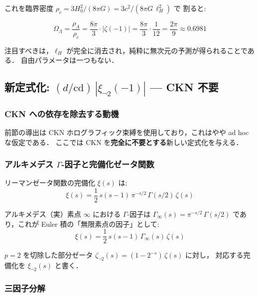 \documentclass[11pt,a4paper]{article}
\begin{document}
これを臨界密度 $\rho_c = 3H_0^2/(8\pi G) = 3c^2/(8\pi G\,\ell_H^2)$ で
割ると:

\begin{keyresult}
\begin{equation}
\Omega_\Lambda = \frac{\rho_\Lambda}{\rho_c}
= \frac{8\pi}{3}\cdot|\zeta(-1)|
= \frac{8\pi}{3}\cdot\frac{1}{12}
= \frac{2\pi}{9}
\approx 0.6981
\end{equation}
\end{keyresult}

注目すべきは，$\ell_H$ が完全に消去され，純粋に無次元の予測が得られることである．
自由パラメータは一つもない．

\subsection{新定式化: $(d/\mathrm{cd})\,|\xi_{\neg 2}(-1)|$ — CKN 不要}

\subsubsection{CKN への依存を除去する動機}

前節の導出は CKN ホログラフィック束縛を使用しており，これはやや ad hoc な仮定である．
ここでは CKN を\textbf{完全に不要とする}新しい定式化を与える．

\subsubsection{アルキメデス $\Gamma$-因子と完備化ゼータ関数}

リーマンゼータ関数の完備化 $\xi(s)$ は:
\begin{equation}
\xi(s) = \frac{1}{2}\,s(s-1)\,\pi^{-s/2}\,\Gamma(s/2)\,\zeta(s)
\end{equation}

アルキメデス（実）素点 $\infty$ における $\Gamma$-因子は
$\Gamma_\infty(s) = \pi^{-s/2}\,\Gamma(s/2)$ であり，これが
Euler 積の「無限素点の因子」として:
\begin{equation}
\xi(s) = \frac{1}{2}\,s(s-1)\,\Gamma_\infty(s)\,\zeta(s)
\end{equation}

$p=2$ を切除した部分ゼータ $\zeta_{\neg 2}(s) = (1 - 2^{-s})\,\zeta(s)$ に対し，
対応する完備化を $\xi_{\neg 2}(s)$ と書く．

\subsubsection{三因子分解}
\end{document}
